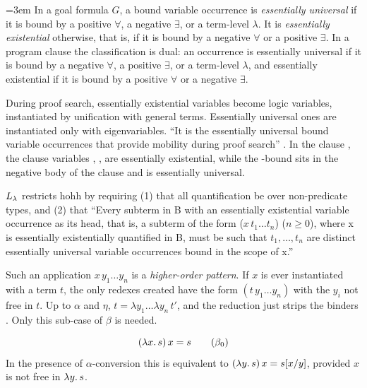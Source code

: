 {{{{{{\begin{definition}\label{def:lambdatree-essential}\emergencystretch=3em
In a goal formula $G$, a bound variable occurrence is \emph{essentially universal} if it is bound by a positive
$\forall$, a negative $\exists$, or a term-level $\lambda$. It is \emph{essentially existential} otherwise, that is,
if it is bound by a negative $\forall$ or a positive $\exists$. In a program clause the classification is dual: an
occurrence is essentially universal if it is bound by a negative $\forall$, a positive $\exists$, or a term-level
$\lambda$, and essentially existential if it is bound by a positive $\forall$ or a negative $\exists$.
\end{definition}
During proof search, essentially existential variables become logic variables, instantiated by unification
with general terms. Essentially universal ones are instantiated only with eigenvariables. \enquote{It is the
essentially universal bound variable occurrences that provide mobility during proof search} . In the
clause , the clause variables ,
,  are essentially existential, while the -bound  sits in the negative body of the clause
and is essentially universal.

\begin{definition}\label{def:lambdatree-llambda}
$L_\lambda$ restricts hohh by requiring (1) that all quantification be over non-predicate types, and (2) that
\enquote{Every subterm in B with an essentially existential variable occurrence as its head, that is, a subterm of
the form ($x\,t_1\ldots t_n$) ($n\ge0$), where x is essentially existentially quantified in B, must be such that
$t_1,\ldots,t_n$ are distinct essentially universal variable occurrences bound in the scope of x.}
\end{definition}
Such an application $x\,y_1\ldots y_n$ is a \emph{higher-order pattern}. If $x$ is ever instantiated with a
term $t$, the only redexes created have the form $(t\,y_1\ldots y_n)$ with the $y_i$ not free in $t$. Up to
$\alpha$ and $\eta$, $t=\lambda y_1\ldots\lambda y_n\,t'$, and the reduction just strips the binders
. Only this sub-case of $\beta$ is needed.

\begin{definition}\label{def:lambdatree-beta0}
\[
(\lambda x.\,s)\,x = s \qquad(\beta_0)
\]
In the presence of $\alpha$-conversion this is equivalent to $(\lambda y.\,s)\,x=s[x/y]$, provided $x$ is not
free in $\lambda y.\,s$.
\end{definition}

}}}}}}

